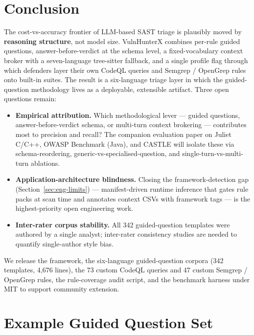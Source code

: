 \documentclass[11pt,a4paper]{article}
\begin{document}
\section{Conclusion}
\label{sec:conclusion}

The cost-vs-accuracy frontier of LLM-based SAST triage is plausibly
moved by \textbf{reasoning structure}, not model size. VulnHunterX
combines per-rule guided questions, answer-before-verdict at the
schema level, a fixed-vocabulary context broker with a seven-language
tree-sitter fallback, and a single profile flag through which defenders
layer their own CodeQL queries and Semgrep / OpenGrep rules onto
built-in suites. The result is a six-language triage layer in which
the guided-question methodology lives as a deployable, extensible
artifact. Three open questions remain:

\begin{itemize}[leftmargin=*]
\item \textbf{Empirical attribution.} Which methodological lever ---
  guided questions, answer-before-verdict schema, or multi-turn
  context brokering --- contributes most to precision and recall? The
  companion evaluation paper on Juliet C/C++, OWASP Benchmark (Java),
  and CASTLE will isolate these via schema-reordering,
  generic-vs-specialised-question, and
  single-turn-vs-multi-turn ablations.
\item \textbf{Application-architecture blindness.} Closing the
  framework-detection gap (Section~\ref{sec:eng-limits}) ---
  manifest-driven runtime inference that gates rule packs at scan time
  and annotates context CSVs with framework tags --- is the
  highest-priority open engineering work.
\item \textbf{Inter-rater corpus stability.} All 342 guided-question
  templates were authored by a single analyst; inter-rater consistency
  studies are needed to quantify single-author style bias.
\end{itemize}

We release the framework, the six-language guided-question corpora
(342 templates, 4{,}676 lines), the 73 custom CodeQL queries and 47
custom Semgrep / OpenGrep rules, the rule-coverage audit script, and
the benchmark harness under MIT to support community extension.

\appendix

\section{Example Guided Question Set}
\label{app:question-example}
\end{document}
